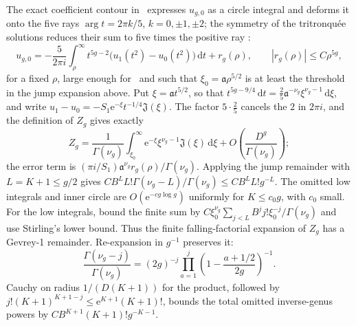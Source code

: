 The exact coefficient contour in~\cite[Section~2.3]{GIKM} expresses
$u_{g,0}$ as a circle integral and deforms it onto the five rays
$\arg t=2\pi k/5$, $k=0,\pm1,\pm2$; the symmetry of the tritronqu\'ee
solutions reduces their sum to five times the positive ray
\cite[equations~(2.25) and~(2.29)]{GIKM}:
\[
 u_{g,0}=-\frac5{2\pi i}\int_\rho^\infty t^{5g-2}
        \bigl(u_1(t^2)-u_0(t^2)\bigr)\,\mathrm{d}t+r_g(\rho),
 \qquad |r_g(\rho)|\le C\rho^{5g},
\]
for a fixed $\rho$, large enough for~\cite{GIKM} and such that
$\xi_0=\mathfrak a\rho^{5/2}$ is at least the threshold in the jump
expansion above. Put $\xi=\mathfrak at^{5/2}$, so that
$t^{5g-9/4}\,\mathrm{d}t=\tfrac25\mathfrak a^{-\nu_g}\xi^{\nu_g-1}\,\mathrm{d}\xi$,
and write $u_1-u_0=-S_1\mathrm{e}^{-\xi}t^{-1/4}\mathfrak J(\xi)$. The
factor $5\cdot\tfrac25$ cancels the $2$ in $2\pi i$, and the definition
of $Z_g$ gives exactly
\[
 Z_g=\frac1{\Gamma(\nu_g)}\int_{\xi_0}^{\infty}
        \mathrm{e}^{-\xi}\xi^{\nu_g-1}\mathfrak J(\xi)\,\mathrm{d}\xi
       +O\!\left(\frac{D^g}{\Gamma(\nu_g)}\right);
\]
the error term is $(\pi i/S_1)\mathfrak a^{\nu_g}r_g(\rho)/\Gamma(\nu_g)$. Applying the jump remainder
with $L=K+1\le g/2$ gives
$CB^LL!\Gamma(\nu_g-L)/\Gamma(\nu_g)\le CB^LL!g^{-L}$.
The omitted low integrals and inner circle are
$O(\mathrm{e}^{-c g\log g})$ uniformly for $K\le c_0g$, with $c_0$ small.
For the low integrals, bound the finite sum by
$C\xi_0^{\nu_g}\sum_{j<L}B^jj!\xi_0^{-j}/\Gamma(\nu_g)$
and use Stirling's lower bound.
Thus the finite falling-factorial expansion of $Z_g$ has a Gevrey-1
remainder. Re-expansion in $g^{-1}$ preserves it:
\[
 \frac{\Gamma(\nu_g-j)}{\Gamma(\nu_g)}
 =(2g)^{-j}\prod_{a=1}^j\left(1-\frac{a+1/2}{2g}\right)^{-1}.
\]
Cauchy on radius $1/(D(K+1))$ for the product, followed by
$j!(K+1)^{K+1-j}\le \mathrm{e}^{K+1}(K+1)!$, bounds the total omitted
inverse-genus powers by $CB^{K+1}(K+1)!g^{-K-1}$.

